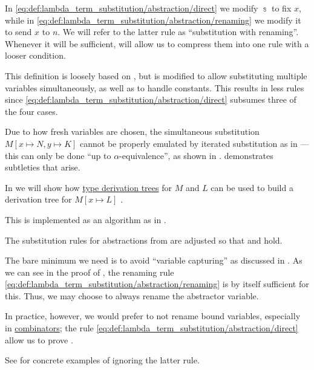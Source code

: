 \begin{comments}
  \item In \eqref{eq:def:lambda_term_substitution/abstraction/direct} we modify \( \Bbbs \) to fix \( x \), while in \eqref{eq:def:lambda_term_substitution/abstraction/renaming} we modify it to send \( x \) to \( n \). We will refer to the latter rule as \enquote{substitution with renaming}. Whenever it will be sufficient,  will allow us to compress them into one rule with a looser condition.

  \item This definition is loosely based on \cite[def. 1A7]{Hindley1997BasicSTT}, but is modified to allow substituting multiple variables simultaneously, as well as to handle constants. This results in less rules since \eqref{eq:def:lambda_term_substitution/abstraction/direct} subsumes three of the four cases.

  \item Due to how fresh variables are chosen, the simultaneous substitution \( M[x \mapsto N, y \mapsto K] \) cannot be properly emulated by iterated substitution as in  --- this can only be done \enquote{up to \( \alpha \)-equivalence}, as shown in .  demonstrates subtleties that arise.

  \item In  we will show how \hyperref[def:type_derivation_tree]{type derivation trees} for \( M \) and \( L \) can be used to build a derivation tree for \( M[x \mapsto L] \) .

  \item This is implemented as an algorithm as  in \cite{notebook:code}.
\end{comments}

\begin{remark}\label{rem:renaming_substitution_rules}
  The substitution rules for abstractions from  are adjusted so that  and  hold.

  The bare minimum we need is to avoid \enquote{variable capturing} as discussed in . As we can see in the proof of , the renaming rule \eqref{eq:def:lambda_term_substitution/abstraction/renaming} is by itself sufficient for this. Thus, we may choose to always rename the abstractor variable.

  In practice, however, we would prefer to not rename bound variables, especially in \hyperref[def:lambda_combinator]{combinators}; the rule \eqref{eq:def:lambda_term_substitution/abstraction/direct} allow us to prove .

  See  for concrete examples of ignoring the latter rule.
\end{remark}


